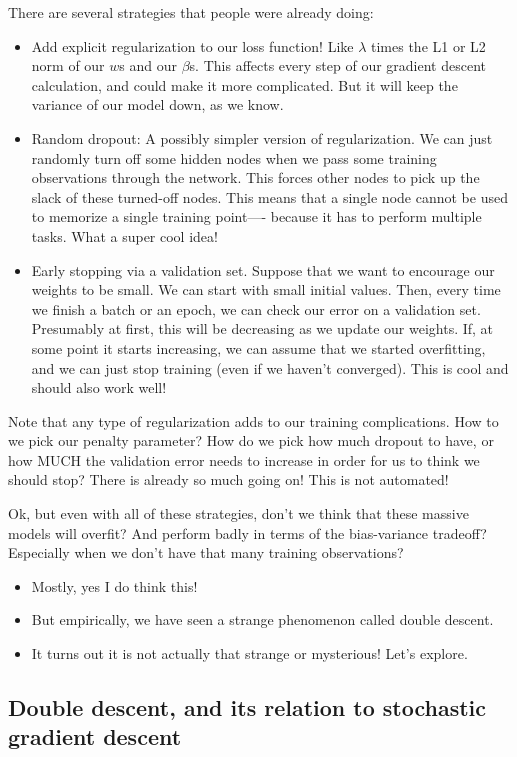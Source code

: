 There are several strategies that people were already doing:
\begin{itemize}
\item Add explicit regularization to our loss function! Like $\lambda$ times the L1 or L2 norm of our $w$s and our $\beta$s. This affects every step of our gradient descent calculation, and could make it more complicated. But it will keep the variance of our model down, as we know. 
\item Random dropout: A possibly simpler version of regularization. We can just randomly turn off some hidden nodes when we pass some training observations through the network. This forces other nodes to pick up the slack of these turned-off nodes. This means that a single node cannot be used to memorize a single training point---- because it has to perform multiple tasks. What a super cool idea!  
\item Early stopping via a validation set. Suppose that we want to encourage our weights to be small. We can start with small initial values. Then, every time we finish a batch or an epoch, we can check our error on a validation set. Presumably at first, this will be decreasing as we update our weights. If, at some point it starts increasing, we can assume that we started overfitting, and we can just stop training (even if we haven't converged). This is cool and should also work well! 
\end{itemize}
Note that any type of regularization adds to our training complications. How to we pick our penalty parameter? How do we pick how much dropout to have, or how MUCH the validation error needs to increase in order for us to think we should stop? There is already so much going on! This is not automated! 

Ok, but even with all of these strategies, don't we think that these massive models will overfit? And perform badly in terms of the bias-variance tradeoff? Especially when we don't have that many training observations? 
\begin{itemize}
\item Mostly, yes I do think this!
\item But empirically, we have seen a strange phenomenon called double descent.
\item It turns out it is not actually that strange or mysterious! Let's explore. 	
\end{itemize}


\subsection{Double descent, and its relation to stochastic gradient descent}

